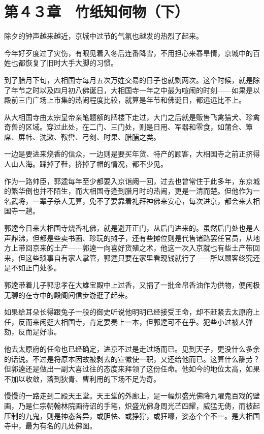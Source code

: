 \section{第４３章　竹纸知何物（下）}

除夕的钟声越来越近，京城中过节的气氛也越发的热烈了起来。

今年好歹度过了灾伤，有眼见着入冬后连番降雪，不用担心来春旱情，京城中的百姓也都恢复了旧时大手大脚的习惯。

到了腊月下旬，大相国寺每月五次万姓交易的日子也就剩两次。这个时候，就是除了年节之时以及四月初八佛诞日，大相国寺一年之中最为喧闹的时刻——如果是以殿前三门广场上市集的热闹程度比较，就算是年节和佛诞日，都远远比不上。

从大相国寺由太宗皇帝亲笔题额的牌楼下走过，大门之后就是贩售飞禽猫犬、珍禽奇兽的区域。穿过此处，在二门、三门处，则是日用、军器和零食，如蒲合、簟席、屏帏、洗漱、鞍辔、弓剑、时果、腊脯之类。

一边是要进来烧香的信众，一边则是要买年货、特产的顾客，大相国寺之前正挤得人山人海。踩掉了鞋，挤掉了帽的情况，都不少见。

作为一路帅臣，郭逵每年至少都要入京诣阙一回，过去也曾常住于此多年，东京城的繁华倒也并不陌生，而大相国寺逢到腊月时的热闹，更是一清而楚。但他作为一名武将，一辈子杀人无算，免不了要靠着礼拜神佛来安心，每次进京，都会来大相国寺一趟。

郭逵今日来大相国寺烧香礼佛，就是避开正门，从后门进来的。虽然后门处也是人声鼎沸，但都是些卖书画、珍玩的摊子，还有些摊位则是代售诸路罢任官员，从地方上带回京来的土产——郭逵一向喜好货殖之术，他这一次入京就也有些土产带回来，但这些琐事自有家人掌管，郭逵只要在家里看现钱就行了——所以顾客终究还是不如正门处多。

郭逵带着儿子郭忠孝在大雄宝殿中上过香，又捐了一批金帛香油作为供物，便闲极无聊的在寺中的殿阁间信步游逛了起来。

如果给耳朵长得跟兔子一般的御史听说他明明已经接受王命，却不赶紧去太原府上任，反而来闲逛大相国寺，肯定要奏上一本，但郭逵可不在乎。犯些小过被人弹劾，反而是好事。

他去太原府的任命也已经确定，进京不过是走过场而已。见到天子，更没什么多余的话说。不过是将原本因故被剥去的宣徽使一职，又还给他而已。这算什么酬劳？但郭逵还是做出一副大喜过往的态度来拜领了这份任命。他如今的地位太高，如果不加以收敛，落到狄青、曹利用的下场不足为奇。

慢慢的一路走到二殿天王堂。天王堂的外廊上，是一幅炽盛光佛降九矅鬼百戏的壁画，乃是仁宗朝翰林院画待诏的手笔，炽盛光佛身周光芒四耀，威猛无俦，而被起压制的九鬼，则是神态各异，或胆怯、或狰狞，或狂嚎，姿态个个不一。是大相国寺中，最为有名的几处佛图。

